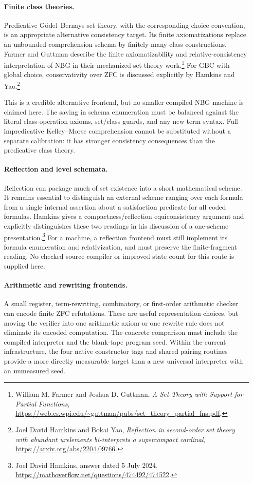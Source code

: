 \paragraph{Finite class theories.}
Predicative G\"odel--Bernays set theory, with the corresponding choice
convention, is an appropriate alternative consistency target.  Its finite
axiomatizations replace an unbounded comprehension schema by finitely
many class constructions.  Farmer and Guttman describe the finite
axiomatizability and relative-consistency interpretation of NBG in their
mechanized-set-theory work.\footnote{William M. Farmer and Joshua D.
Guttman, \emph{A Set Theory with Support for Partial Functions},
\url{https://web.cs.wpi.edu/~guttman/pubs/set_theory_partial_fns.pdf}.}
For GBC with global choice, conservativity over ZFC is discussed explicitly
by Hamkins and Yao.\footnote{Joel David Hamkins and Bokai Yao,
\emph{Reflection in second-order set theory with abundant urelements
bi-interprets a supercompact cardinal},
\url{https://arxiv.org/abs/2204.09766}.}

This is a credible alternative frontend, but no smaller compiled NBG
machine is claimed here.  The saving in schema enumeration must be
balanced against the literal class-operation axioms, set/class guards,
and any new term syntax.  Full impredicative Kelley--Morse comprehension
cannot be substituted without a separate calibration: it has stronger
consistency consequences than the predicative class theory.

\paragraph{Reflection and level schemata.}
Reflection can package much of set existence into a short mathematical
scheme.  It remains essential to distinguish an external scheme ranging
over each formula from a single internal assertion about a satisfaction
predicate for all coded formulas.  Hamkins gives a compactness/reflection
equiconsistency argument and explicitly distinguishes these two readings
in his discussion of a one-scheme presentation.\footnote{Joel David
Hamkins, answer dated 5 July 2024,
\url{https://mathoverflow.net/questions/474492/474522}.}
For a machine, a reflection frontend must still implement its formula
enumeration and relativization, and must preserve the finite-fragment
reading.  No checked source compiler or improved state count for this
route is supplied here.

\paragraph{Arithmetic and rewriting frontends.}
A small register, term-rewriting, combinatory, or first-order arithmetic
checker can encode finite ZFC refutations.  These are useful representation
choices, but moving the verifier into one arithmetic axiom or one rewrite
rule does not eliminate its encoded computation.  The concrete comparison
must include the compiled interpreter and the blank-tape program seed.
Within the current infrastructure, the four native constructor tags and
shared pairing routines provide a more directly measurable target than a
new universal interpreter with an unmeasured seed.

